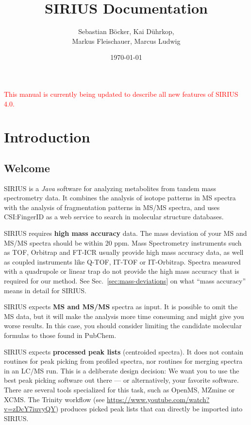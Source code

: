 \documentclass[letterpaper,10pt,openany,oneside]{sphinxmanual}
\title{SIRIUS Documentation}
\date{\today}
\author{Sebastian Böcker, Kai Dührkop, \\ Markus Fleischauer, Marcus Ludwig}
\begin{document}
\maketitle
{\huge\textcolor{red}{ This manual is currently being updated to describe 
all new features of SIRIUS 4.0.}}

\tableofcontents
{}\label{index::doc}



\chapter{Introduction}
\label{introduction:introduction}
\label{introduction::doc}
\label{introduction:welcome-to-sirius-s-documentation}

\section{Welcome}

SIRIUS is a \emph{Java} software for analyzing metabolites from tandem mass
spectrometry data. It combines the analysis of isotope patterns in MS spectra
with the analysis of fragmentation patterns in MS/MS spectra, and uses
CSI:FingerID as a web service to search in molecular structure databases.

SIRIUS requires \textbf{high mass accuracy} data. The mass deviation of
your MS and MS/MS spectra should be within 20 ppm.  Mass Spectrometry
instruments such as TOF, Orbitrap and FT-ICR usually provide high mass
accuracy data, as well as coupled instruments like Q-TOF, IT-TOF or
IT-Orbitrap.  Spectra measured with a quadrupole or linear trap do not
provide the high mass accuracy that is required for our method.  See
Sec.~\ref{sec:mass-deviations} on what ``mass accuracy'' means in detail for
SIRIUS.

SIRIUS expects \textbf{MS and MS/MS} spectra as input.  It is possible to
omit the MS data, but it will make the analysis more time consuming and
might give you worse results.  In this case, you should consider limiting the
candidate molecular formulas to those found in PubChem.

SIRIUS expects \textbf{processed peak lists} (centroided spectra). It does
not contain routines for peak picking from profiled spectra, nor routines for
merging spectra in an LC/MS run.  This is a deliberate design decision: We
want you to use the best peak picking software out there --- or
alternatively, your favorite software.  There are several tools specialized
for this task, such as OpenMS, MZmine or XCMS.  The Trinity workflow
(see \url{https://www.youtube.com/watch?v=zDcY7iuvyQY}) produces picked peak
lists that can directly be imported into SIRIUS.
\end{document}
